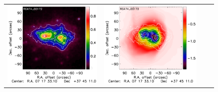 \documentclass[twocolumn,traditabstract]{aa}
\begin{document}
\begin{figure}[h]
{\begin{tabular}{llll}
\includegraphics[trim=0cm 2.2cm 0cm 0cm, clip=true, scale=1]{Figure/Map_RG474_00172_DMmap_zproj_zobs0p9_raw.pdf} & 
\includegraphics[trim=2.3cm 2.2cm 0cm 0cm, clip=true, scale=1]{Figure/Map_RG474_00172_Ymap_zobs0p9_raw.pdf} & 

\end{tabular}}
\end{figure}
\end{document}
